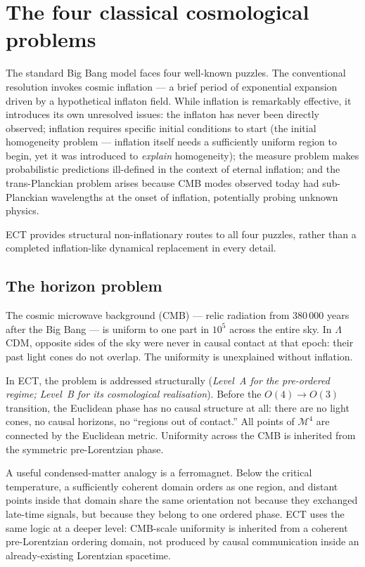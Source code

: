 \documentclass[11pt,a4paper]{article}
\begin{document}
\section{The four classical cosmological problems}
\label{sec:pop_cosmo_problems}

The standard Big Bang model faces four well-known puzzles. The conventional resolution invokes cosmic inflation --- a brief period of exponential expansion driven by a hypothetical inflaton field. While inflation is remarkably effective, it introduces its own unresolved issues: the inflaton has never been directly observed; inflation requires specific initial conditions to start (the initial homogeneity problem --- inflation itself needs a sufficiently uniform region to begin, yet it was introduced to \emph{explain} homogeneity); the measure problem makes probabilistic predictions ill-defined in the context of eternal inflation; and the trans-Planckian problem arises because CMB modes observed today had sub-Planckian wavelengths at the onset of inflation, potentially probing unknown physics.

ECT provides structural non-inflationary routes to all four puzzles, rather than a completed inflation-like dynamical replacement in every detail.

\subsection{The horizon problem}

The cosmic microwave background (CMB) --- relic radiation from 380\,000 years after the Big Bang --- is uniform to one part in $10^5$ across the entire sky. In $\Lambda$CDM, opposite sides of the sky were never in causal contact at that epoch: their past light cones do not overlap. The uniformity is unexplained without inflation.

In ECT, the problem is addressed structurally (\emph{Level~A for the pre-ordered regime; Level~B for its cosmological realisation}). Before the $O(4) \to O(3)$ transition, the Euclidean phase has no causal structure at all: there are no light cones, no causal horizons, no ``regions out of contact.'' All points of $\mathcal{M}^4$ are connected by the Euclidean metric. Uniformity across the CMB is inherited from the symmetric pre-Lorentzian phase.

A useful condensed-matter analogy is a ferromagnet. Below the critical temperature, a sufficiently coherent domain orders as one region, and distant points inside that domain share the same orientation not because they exchanged late-time signals, but because they belong to one ordered phase. ECT uses the same logic at a deeper level: CMB-scale uniformity is inherited from a coherent pre-Lorentzian ordering domain, not produced by causal communication inside an already-existing Lorentzian spacetime.
\end{document}
